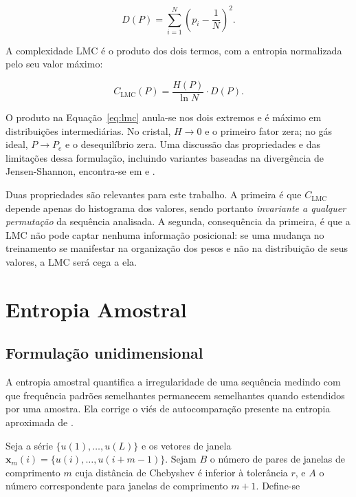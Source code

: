 \begin{equation}
    D(P) = \sum_{i=1}^{N} \left( p_i - \frac{1}{N} \right)^{2}.
    \label{eq:desequilibrio}
\end{equation}

A complexidade LMC é o produto dos dois termos, com a entropia normalizada pelo
seu valor máximo:

\begin{equation}
    C_{\mathrm{LMC}}(P) = \frac{H(P)}{\ln N} \cdot D(P).
    \label{eq:lmc}
\end{equation}

O produto na Equação~\ref{eq:lmc} anula-se nos dois extremos e é máximo em
distribuições intermediárias. No cristal, $H \to 0$ e o primeiro fator zera; no
gás ideal, $P \to P_e$ e o desequilíbrio zera. Uma discussão das propriedades e
das limitações dessa formulação, incluindo variantes baseadas na divergência de
Jensen-Shannon, encontra-se em  e
.

Duas propriedades são relevantes para este trabalho. A primeira é que
$C_{\mathrm{LMC}}$ depende apenas do histograma dos valores, sendo portanto
\emph{invariante a qualquer permutação} da sequência analisada. A segunda,
consequência da primeira, é que a LMC não pode captar nenhuma informação
posicional: se uma mudança no treinamento se manifestar na organização dos
pesos e não na distribuição de seus valores, a LMC será cega a ela.

\section{Entropia Amostral}
\label{sec:T-sampen}

\subsection{Formulação unidimensional}

A entropia amostral \cite{richman2000} quantifica a irregularidade de uma
sequência medindo com que frequência padrões semelhantes permanecem semelhantes
quando estendidos por uma amostra. Ela corrige o viés de autocomparação
presente na entropia aproximada de .

Seja a série $\{u(1), \dots, u(L)\}$ e os vetores de janela
$\mathbf{x}_m(i) = \{u(i), \dots, u(i+m-1)\}$. Sejam $B$ o número de pares de
janelas de comprimento $m$ cuja distância de Chebyshev é inferior à tolerância
$r$, e $A$ o número correspondente para janelas de comprimento $m+1$. Define-se

